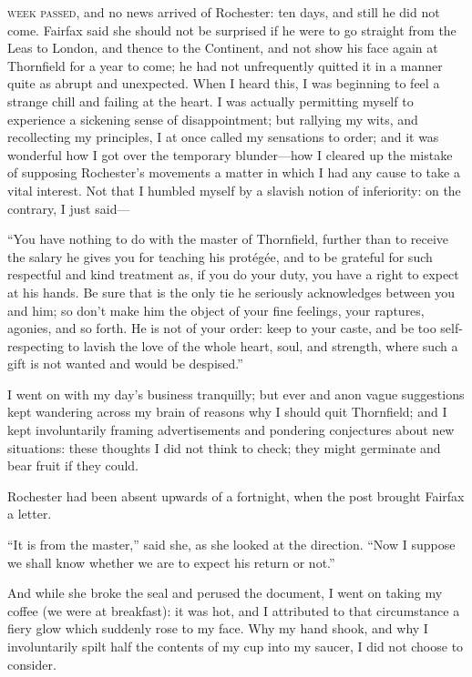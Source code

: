
 \textsc{week passed,} and no news arrived of \Mr{} Rochester: ten days, and still
he did not come. \Mrs{} Fairfax said she should not be surprised if he
were to go straight from the Leas to London, and thence to the
Continent, and not show his face again at Thornfield for a year to come;
he had not unfrequently quitted it in a manner quite as abrupt and
unexpected. When I heard this, I was beginning to feel a strange chill
and failing at the heart. I was actually permitting myself to
experience a sickening sense of disappointment; but rallying my wits,
and recollecting my principles, I at once called my sensations to order;
and it was wonderful how I got over the temporary blunder---how I
cleared up the mistake of supposing \Mr{} Rochester's movements a matter
in which I had any cause to take a vital interest. Not that I humbled
myself by a slavish notion of inferiority: on the contrary, I just
said---

\enquote{You have nothing to do with the master of Thornfield, further
than to receive the salary he gives you for teaching his protégée, and
to be grateful for such respectful and kind treatment as, if you do your
duty, you have a right to expect at his hands. Be sure that is the only
tie he seriously acknowledges between you and him; so don't make him the
object of your fine feelings, your raptures, agonies, and so forth. He
is not of your order: keep to your caste, and be too self-respecting to
lavish the love of the whole heart, soul, and strength, where such a
gift is not wanted and would be despised.}

I went on with my day's business tranquilly; but ever and anon vague
suggestions kept wandering across my brain of reasons why I should quit
Thornfield; and I kept involuntarily framing advertisements and
pondering conjectures about new situations: these thoughts I did not
think to check; they might germinate and bear fruit if they could.

\Mr{} Rochester had been absent upwards of a fortnight, when the post
brought \Mrs{} Fairfax a letter.

\enquote{It is from the master,} said she, as she looked at the
direction. \enquote{Now I suppose we shall know whether we are to
expect his return or not.}

And while she broke the seal and perused the document, I went on taking
my coffee (we were at breakfast): it was hot, and I attributed to that
circumstance a fiery glow which suddenly rose to my face. Why my hand
shook, and why I involuntarily spilt half the contents of my cup into my
saucer, I did not choose to consider.

